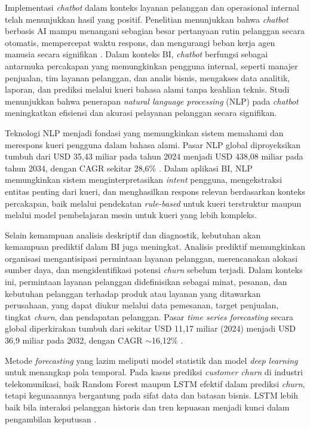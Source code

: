 Implementasi \textit{chatbot} dalam konteks layanan pelanggan dan operasional internal telah menunjukkan hasil yang positif. Penelitian menunjukkan bahwa \textit{chatbot} berbasis AI mampu menangani sebagian besar pertanyaan rutin pelanggan secara otomatis, mempercepat waktu respons, dan mengurangi beban kerja agen manusia secara signifikan \autocite{Adam2021Chatbots}. Dalam konteks BI, \textit{chatbot} berfungsi sebagai antarmuka percakapan yang memungkinkan pengguna internal, seperti manajer penjualan, tim layanan pelanggan, dan analis bisnis, mengakses data analitik, laporan, dan prediksi melalui kueri bahasa alami tanpa keahlian teknis. Studi \autocite{Iqbal2021} menunjukkan bahwa penerapan \textit{natural language processing} (NLP)\label{abbr:NLP} pada \textit{chatbot} meningkatkan efisiensi dan akurasi pelayanan pelanggan secara signifikan.

Teknologi NLP menjadi fondasi yang memungkinkan sistem memahami dan merespons kueri pengguna dalam bahasa alami. Pasar NLP global diproyeksikan tumbuh dari USD 35{,}43 miliar pada tahun 2024 menjadi USD 438{,}08 miliar pada tahun 2034, dengan CAGR sekitar 28{,}6\% \autocite{Precedence2025}. Dalam aplikasi BI, NLP memungkinkan sistem menginterpretasikan \textit{intent} pengguna, mengekstraksi entitas penting dari kueri, dan menghasilkan respons relevan berdasarkan konteks percakapan, baik melalui pendekatan \textit{rule-based} untuk kueri terstruktur maupun melalui model pembelajaran mesin untuk kueri yang lebih kompleks.

Selain kemampuan analisis deskriptif dan diagnostik, kebutuhan akan kemampuan prediktif dalam BI juga meningkat. Analisis prediktif memungkinkan organisasi mengantisipasi permintaan layanan pelanggan, merencanakan alokasi sumber daya, dan mengidentifikasi potensi \textit{churn} sebelum terjadi. Dalam konteks ini, permintaan layanan pelanggan didefinisikan sebagai minat, pesanan, dan kebutuhan pelanggan terhadap produk atau layanan yang ditawarkan perusahaan, yang dapat diukur melalui data pemesanan, target penjualan, tingkat \textit{churn}, dan pendapatan pelanggan. Pasar \textit{time series forecasting} secara global diperkirakan tumbuh dari sekitar USD 11{,}17 miliar (2024) menjadi USD 36{,}9 miliar pada 2032, dengan CAGR \mbox{$\sim$16{,}12\%} \autocite{WiseGuyReports2024}.

Metode \textit{forecasting} yang lazim meliputi model statistik dan model \textit{deep learning} untuk menangkap pola temporal. Pada kasus prediksi \textit{customer churn} di industri telekomunikasi, baik Random Forest maupun LSTM efektif dalam prediksi \textit{churn}, tetapi kegunaannya bergantung pada sifat data dan batasan bisnis. LSTM lebih baik bila interaksi pelanggan historis dan tren kepuasan menjadi kunci dalam pengambilan keputusan \autocite{Mena2023}.

